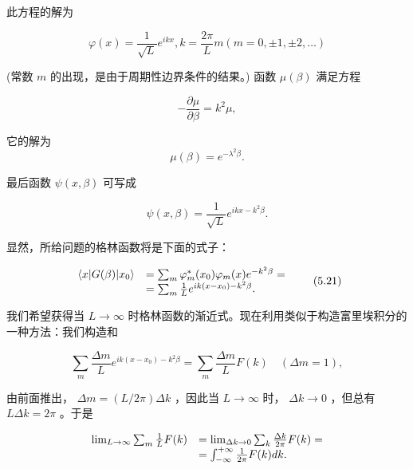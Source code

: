 此方程的解为

\begin{equation*}
\varphi (x) = \frac {1}{\sqrt {L}} e ^ {i k x}, k = \frac {2 \pi}{L} m (m = 0, \pm 1, \pm 2, \dots)
\end{equation*}

(常数 $m$ 的出现，是由于周期性边界条件的结果。) 函数 $\mu(\beta)$ 满足方程

\begin{equation*}
- \frac {\partial \mu}{\partial \beta} = k ^ {2} \mu ,
\end{equation*}

它的解为
\begin{equation*}
\mu (\beta) = e ^ {- \lambda^ {2} \beta}.
\end{equation*}

最后函数 $\psi (x,\beta)$ 可写成

\begin{equation*}
\psi (x, \beta) = \frac {1}{\sqrt {L}} e ^ {i k x - k ^ {2} \beta}.
\end{equation*}

显然，所给问题的格林函数将是下面的式子：

\begin{equation*}
\begin{array}{r l} \langle x | G (\beta) | x _ {0} \rangle & = \sum_ {m} \varphi_ {m} ^ {*} (x _ {0}) \varphi_ {m} (x) e ^ {- k ^ {2} \beta} = \\ & = \sum_ {m} \frac {1}{L} e ^ {i k (x - x _ {0}) - k ^ {2} \beta}. \end{array}\tag{5.21}
\end{equation*}

我们希望获得当 $L \to \infty$ 时格林函数的渐近式。现在利用类似于构造富里埃积分的一种方法：我们构造和

\begin{equation*}
\sum_ {m} \frac {\Delta m}{L} e ^ {i k (x - x _ {0}) - k ^ {2} \beta} = \sum_ {m} \frac {\Delta m}{L} F (k) \quad (\Delta m = 1),
\end{equation*}

由前面推出， $\Delta m=(L/2\pi)\Delta k$ ，因此当 $L\to\infty$ 时， $\Delta k\to0$ ，但总有 $L\Delta k=2\pi$ 。于是

\begin{equation*}
\begin{array}{r l}\lim _ {L \rightarrow \infty} \sum_ {m} \frac {1}{L} F (k)&= \lim _ {\Delta k \rightarrow 0} \sum_ {k} \frac {\Delta k}{2 \pi} F (k) =\\&= \int_ {- \infty} ^ {+ \infty} \frac {1}{2 \pi} F (k) d k.\end{array}
\end{equation*}

